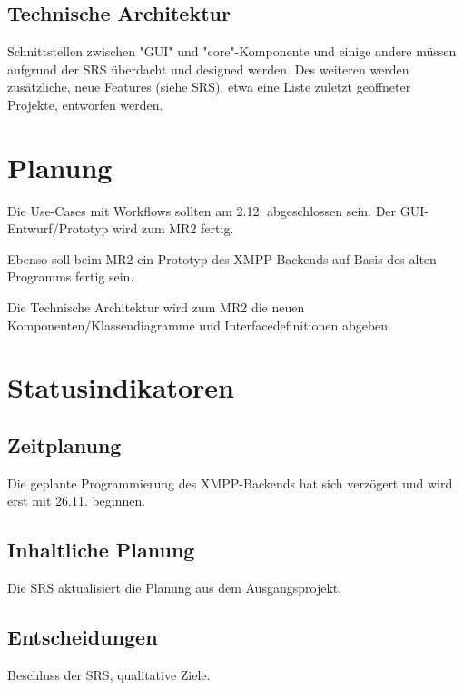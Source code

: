 \subsection{Technische Architektur}
Schnittstellen zwischen "GUI" und "core"-Komponente und einige andere müssen 
aufgrund der SRS überdacht und designed werden. Des weiteren werden zusätzliche,
neue Features (siehe SRS), etwa eine Liste zuletzt geöffneter Projekte, 
entworfen werden.
\section{Planung}
Die Use-Cases mit Workflows sollten am 2.12. abgeschlossen sein. Der 
GUI-Entwurf/Prototyp wird zum MR2 fertig.

Ebenso soll beim MR2 ein Prototyp des XMPP-Backends auf Basis des alten 
Programms fertig sein.

Die Technische Architektur wird zum MR2 die neuen Komponenten/Klassendiagramme 
und Interfacedefinitionen abgeben.

\section{Statusindikatoren}

\subsection{Zeitplanung}
Die geplante Programmierung des XMPP-Backends hat sich verzögert und wird erst 
mit 26.11. beginnen.

\subsection{Inhaltliche Planung}
Die SRS aktualisiert die Planung aus dem Ausgangsprojekt.

\subsection{Entscheidungen}
Beschluss der SRS, qualitative Ziele.

















